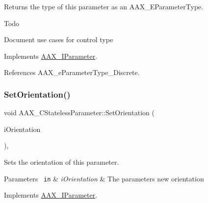 Returns the type of this parameter as an A\+A\+X\+\_\+\+E\+Parameter\+Type. 

\begin{DoxyRefDesc}{Todo}
\item[\mbox{\hyperlink{a00785__todo000049}{Todo}}]Document use cases for control type \end{DoxyRefDesc}


Implements \mbox{\hyperlink{a01857_a0c096b4092b2146d9aa0413bceeaac48}{A\+A\+X\+\_\+\+I\+Parameter}}.



References A\+A\+X\+\_\+e\+Parameter\+Type\+\_\+\+Discrete.

\mbox{\label{a01541_afa70e0faba000d1b6a241dfef7fd528c}} 
\subsubsection{\texorpdfstring{SetOrientation()}{SetOrientation()}}
{\footnotesize\ttfamily void A\+A\+X\+\_\+\+C\+Stateless\+Parameter\+::\+Set\+Orientation (\begin{DoxyParamCaption}\item[{\mbox{\hyperlink{a00491_a52f91d1c14aa5dceedabfb9d2de31bf0}{A\+A\+X\+\_\+\+E\+Parameter\+Orientation}}}]{i\+Orientation }\end{DoxyParamCaption})\hspace{0.3cm}{\ttfamily [inline]}, {\ttfamily [virtual]}}



Sets the orientation of this parameter. 


\begin{DoxyParams}[1]{Parameters}
\mbox{\texttt{ in}}  & {\em i\+Orientation} & The parameter\textquotesingle{}s new orientation \\
\hline
\end{DoxyParams}


Implements \mbox{\hyperlink{a01857_ac8ba9ed15da3c235ef9844177e1cf6d0}{A\+A\+X\+\_\+\+I\+Parameter}}.

\mbox{\label{a01541_a76283186d4844b0b9e6f37168415c93a}} 
